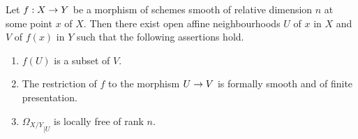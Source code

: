 \begin{theorem}\label{theorem:smoothness_implies_formal_smoothness}
Let $f:X\rightarrow Y$ be a morphism of schemes smooth of relative dimension $n$ at some point $x$ of $X$. Then there exist open affine neighbourhoods $U$ of $x$ in $X$ and $V$ of $f(x)$ in $Y$ such that the following assertions hold.
\begin{enumerate}[label=\emph{\textbf{(\arabic*)}}, leftmargin=3.0em]
\item $f(U)$ is a subset of $V$.
\item The restriction of $f$ to the morphism $U\rightarrow V$ is formally smooth and of finite presentation.
\item ${\Omega_{X/Y}}_{\mid U}$ is locally free of rank $n$.
\end{enumerate}
\end{theorem}
